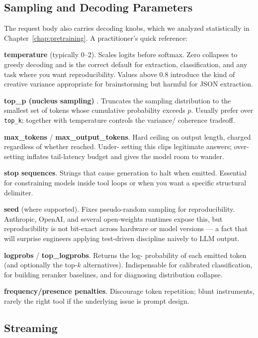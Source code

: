 \subsection{Sampling and Decoding Parameters}

The request body also carries decoding knobs, which we analyzed
statistically in Chapter~\ref{chap:pretraining}. A practitioner's quick reference:

\textbf{temperature} (typically 0--2). Scales logits before
softmax. Zero collapses to greedy decoding and is the correct
default for extraction, classification, and any task where you
want reproducibility. Values above 0.8 introduce the kind of
creative variance appropriate for brainstorming but harmful for
JSON extraction.

\textbf{top\_p (nucleus sampling)} \citep{holtzman2020curious}.
Truncates the sampling distribution to the smallest set of tokens
whose cumulative probability exceeds $p$. Usually prefer over
\texttt{top\_k}; together with temperature controls the variance/
coherence tradeoff.

\textbf{max\_tokens} / \textbf{max\_output\_tokens}. Hard ceiling
on output length, charged regardless of whether reached. Under-
setting this clips legitimate answers; over-setting inflates
tail-latency budget and gives the model room to wander.

\textbf{stop sequences}. Strings that cause generation to halt
when emitted. Essential for constraining models inside tool loops
or when you want a specific structural delimiter.

\textbf{seed} (where supported). Fixes pseudo-random sampling for
reproducibility. Anthropic, OpenAI, and several open-weights
runtimes expose this, but reproducibility is not bit-exact across
hardware or model versions --- a fact that will surprise engineers
applying test-driven discipline naively to LLM output.

\textbf{logprobs} / \textbf{top\_logprobs}. Returns the log-
probability of each emitted token (and optionally the top-$k$
alternatives). Indispensable for calibrated classification, for
building reranker baselines, and for diagnosing distribution
collapse.

\textbf{frequency/presence penalties}. Discourage token
repetition; blunt instruments, rarely the right tool if the
underlying issue is prompt design.

\subsection{Streaming}

